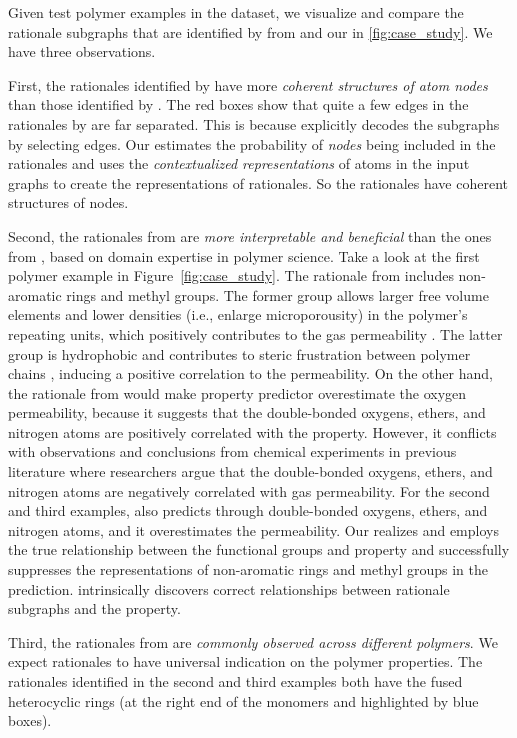 \documentclass[sigconf]{acmart}
\begin{document}
Given test polymer examples in the \oxygen dataset, we visualize and compare the rationale subgraphs that are identified by from \dir \cite{wu2022discovering} and our \method in \cref{fig:case_study}. We have three observations.

First, the rationales identified by \method have more \emph{coherent structures of atom nodes} than those identified by \dir.
The red boxes show that quite a few edges in the rationales by \dir are far separated.
This is because \dir explicitly decodes the subgraphs by selecting edges.
Our \method estimates the probability of \emph{nodes} being included in the rationales and uses the \emph{contextualized representations} of atoms in the input graphs to create the representations of rationales.
So the rationales have coherent structures of nodes.

Second, the rationales from \method are \emph{more interpretable and beneficial} than the ones from \dir, based on domain expertise in polymer science.
Take a look at the first polymer example in Figure~\ref{fig:case_study}.
The rationale from \method includes non-aromatic rings and methyl groups.
The former group allows larger free volume elements and lower densities (i.e., enlarge microporousity) in the polymer's repeating units, which positively contributes to the gas permeability \cite{sanders2013energy,yang2021discovery}.
The latter group is hydrophobic and contributes to steric frustration between polymer chains \cite{yang2021discovery}, inducing a positive correlation to the permeability.
On the other hand, the rationale from \dir would make property predictor overestimate the oxygen permeability, because it suggests that the double-bonded oxygens, ethers, and nitrogen atoms are positively correlated with the property.
However, it conflicts with observations and conclusions from chemical experiments in previous literature \cite{yang2021discovery} where researchers argue that the double-bonded oxygens, ethers, and nitrogen atoms are negatively correlated with gas permeability.
For the second and third examples, \dir also predicts through double-bonded oxygens, ethers, and nitrogen atoms, and it overestimates the permeability.
Our \method realizes and employs the true relationship between the functional groups and property and successfully suppresses the representations of non-aromatic rings and methyl groups in the prediction.
\method intrinsically discovers correct relationships between rationale subgraphs and the property.

Third, the rationales from \method are \emph{commonly observed across different polymers}.
We expect rationales to have universal indication on the polymer properties.
The rationales identified in the second and third examples both have the fused heterocyclic rings (at the right end of the monomers and highlighted by blue boxes).
\end{document}
